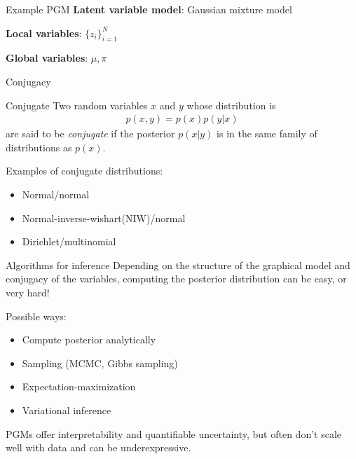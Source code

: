 \documentclass[10pt, compress]{beamer}
\begin{document}
\begin{frame}{Example PGM}
  \textbf{Latent variable model}: Gaussian mixture model
  \begin{center}
    
  \end{center}

  \pause
  \textbf{Local variables}: $\{z_i\}_{i=1}^N$

  \pause
  \textbf{Global variables}: $\mu, \pi$

\end{frame}

\begin{frame}{Conjugacy}
  \begin{block}{Conjugate}
    Two random variables $x$ and $y$ whose distribution is
    \begin{align*}p(x, y) = p(x)p(y | x)\end{align*} are said to be
      \emph{conjugate} if the posterior $p(x | y)$
    is in the same family of distributions as $p(x)$.
  \end{block}
  \pause
  Examples of conjugate distributions:
  \begin{itemize}
    \item Normal/normal
      \pause
    \item Normal-inverse-wishart(NIW)/normal
      \pause
    \item Dirichlet/multinomial
  \end{itemize}
\end{frame}

\begin{frame}{Algorithms for inference}
  Depending on the structure of the graphical model
  and conjugacy of the variables, computing the posterior distribution
  can be easy, or very hard!

  \pause
  Possible ways:
  \begin{itemize}
    \item<2-> Compute posterior analytically
      \pause
    \item<3-> Sampling (MCMC, Gibbs sampling)
      \pause
    \item<4-> Expectation-maximization
      \pause
    \item<5->\alert<6->{Variational inference}
  \end{itemize}
  \pause
  PGMs offer interpretability and quantifiable uncertainty,
  but often don't scale well with data
  and can be underexpressive.
\end{frame}
\end{document}
